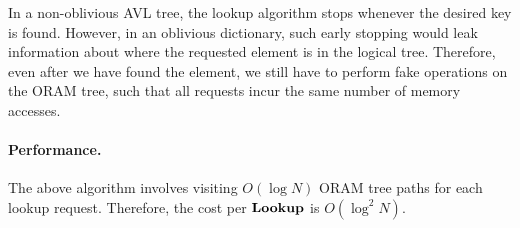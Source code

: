 \documentclass[11pt]{article}
\begin{document}
\begin{remark}
In a non-oblivious AVL tree, the lookup algorithm 
stops whenever the desired key is found.
However, in an oblivious dictionary, such early stopping
would leak information 
about where the 
requested element
is in the logical tree. 
Therefore, even after we have found
the element, we still have to perform fake
operations on the ORAM tree, such that all requests 
incur the same number of memory accesses.
\label{rmk:padfake}
\end{remark}

\paragraph{Performance.}
The above algorithm involves visiting
$O(\log N)$ ORAM tree paths for each lookup request. 
Therefore, the cost per ${\bf Lookup}$ is $O(\log^2 N)$.





\end{document}
